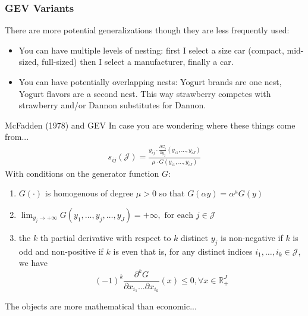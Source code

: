 \documentclass[xcolor=pdftex,dvipsnames,table,mathserif,aspectratio=169]{beamer}
\begin{document}
\begin{frame}
\frametitle{GEV Variants}
There are more potential generalizations though they are less frequently used:
 \begin{itemize}
\item You can have multiple levels of nesting: first I select a size car (compact, mid-sized, full-sized) then I select a manufacturer, finally a car.
\item You can have potentially overlapping nests: Yogurt brands are one nest, Yogurt flavors are a second nest. This way strawberry competes with strawberry and/or Dannon substitutes for Dannon.
 \end{itemize}
\end{frame}

\begin{frame}{McFadden (1978) and GEV}
In case you are wondering where these things come from...
\begin{align*}
s_{ij}(\mathcal{J})=\frac{y_{ij}\cdot  \frac{\partial G_i}{\partial y_{j}}\left(y_{i1}, \ldots, y_{iJ}\right)}{\mu \cdot G\left(y_{i1}, \ldots, y_{iJ}\right)}
\end{align*}
With conditions on the \alert{generator function} $G$:
\begin{enumerate}
\item $G(\cdot)$ is homogenous of degree $\mu > 0$ so that $G(\alpha y)=\alpha^{\mu} G(y)$
\item $\lim _{y_{j} \rightarrow+\infty} G\left(y_{1}, \ldots, y_{j}, \ldots, y_{J}\right)=+\infty, \text { for each } j \in \mathcal{J} $
\item the $k$ th partial derivative with respect to $k$ distinct $y_{j}$ is \alert{non-negative if $k$ is
odd} and \alert{non-positive if $k$ is even} that is, for any distinct indices $i_{1}, \ldots, i_{k} \in \mathcal{J}$, we have
$$
(-1)^{k} \frac{\partial^{k} G}{\partial x_{i_{1}} \ldots \partial x_{i_{k}}}(x) \leq 0, \forall x \in \mathbb{R}_{+}^{J}
$$
\end{enumerate}
The objects are more mathematical than economic...
\end{frame}
\end{document}
